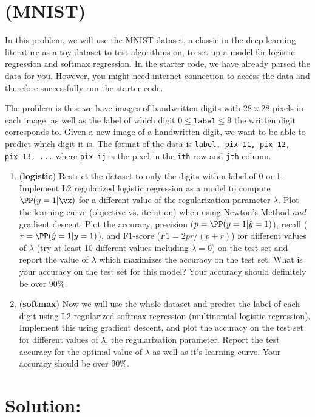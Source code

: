 \documentclass[189]{pset}
\begin{document}
  \section{(MNIST)}
    In this problem, we will use the MNIST dataset, a classic in the
    deep learning literature as a toy dataset to test algorithms on,
    to set up a model for logistic regression and softmax regression.
    In the starter code, we have already parsed the data for you.
    However, you might need internet connection to access the data and
    therefore successfully run the starter code.

    The problem is this: we have images of handwritten digits with
    $28\times 28$ pixels in each image, as well as the label of which
    digit $0 \leq \texttt{label} \leq 9$ the written digit corresponds
    to. Given a new image of a handwritten digit, we want to be able
    to predict which digit it is. The format of the data is
    \texttt{label, pix-11, pix-12, pix-13, ...} where \texttt{pix-ij}
    is the pixel in the \texttt{ith} row and \texttt{jth} column.

    \begin{enumerate}
      \item (\textbf{logistic}) Restrict the dataset to only the
        digits with a label of 0 or 1. Implement L2 regularized
        logistic regression as a model to compute $\PP(y=1|\vx)$ for a
        different value of the regularization parameter $\lambda$.
        Plot the learning curve (objective vs. iteration) when using
        Newton's Method \textit{and} gradient descent. Plot the
        accuracy, precision ($p = \PP(y=1 | \hat y=1)$), recall ($r =
        \PP(\hat y=1 | y=1)$), and F1-score ($F1 = 2pr / (p+r)$) for
        different values of $\lambda$ (try at least 10 different
        values including $\lambda = 0$) on the test set and report the
        value of $\lambda$ which maximizes the accuracy on the test
        set. What is your accuracy on the test set for this model?
        Your accuracy should definitely be over 90\%.
      \item (\textbf{softmax}) Now we will use the whole dataset and
        predict the label of each digit using L2 regularized softmax
        regression (multinomial logistic regression). Implement this
        using gradient descent, and plot the accuracy on the test set
        for different values of $\lambda$, the regularization
        parameter. Report the test accuracy for the optimal value of
        $\lambda$ as well as it's learning curve. Your accuracy should
        be over 90\%.
    \end{enumerate}

  \hrulefill

  \section*{Solution:}
\end{document}
